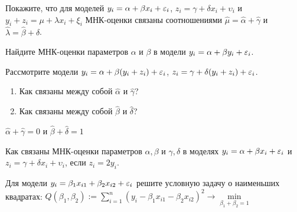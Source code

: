 \documentclass[pdftex,11pt,openany]{book}\usepackage[]{graphicx}\usepackage[]{color}
\begin{document}
\begin{solution}
\end{solution}

\begin{problem}
 Покажите, что для моделей $y_i= \alpha + \beta x_i + \varepsilon_i$, $z_i = \gamma + \delta x_i + \upsilon_i$ и $y_i + z_i = \mu + \lambda x_i + \xi_i$ МНК-оценки связаны соотношениями $\hat{\mu}=\hat{\alpha}+\hat{\gamma}$ и $\hat{\lambda}=\hat{\beta} + \hat{\delta}$.
\end{problem}

\begin{solution}
\end{solution}

\begin{problem}
 Найдите МНК-оценки параметров $\alpha$ и $\beta$ в модели $y_i = \alpha + \beta y_i + \varepsilon_i$.
\end{problem}

\begin{solution}
\end{solution}

\begin{problem}
 Рассмотрите модели $y_i = \alpha + \beta (y_i + z_i) + \varepsilon_i$, $z_i = \gamma + \delta(y_i+z_i) + \varepsilon_i$. 
\begin{enumerate}
\item Как связаны между собой $\hat{\alpha}$ и $\hat{\gamma}$?
\item  Как связаны между собой $\hat{\beta}$ и $\hat{\delta}$?
\end{enumerate} 
\end{problem}

\begin{solution}
$\hat{\alpha} + \hat{\gamma} = 0$ и $\hat{\beta} + \hat{\delta} = 1$
\end{solution}



\begin{problem}
 Как связаны МНК-оценки параметров $\alpha, \beta$ и $\gamma, \delta$ в моделях $y_i = \alpha + \beta x_i + \varepsilon_i$ и $z_i = \gamma + \delta x_i + \upsilon_i$, если $z_i = 2 y_i$.
\end{problem}

\begin{solution}
\end{solution} 

\begin{problem}
 Для модели $y_i = \beta_1 x_{i1} + \beta_2 x_{i2} + \varepsilon_i$ решите условную задачу о наименьших квадратах: $Q(\beta_1, \beta_2) := \sum_{i=1}^n (y_i - \beta_1 x_{i1} - \beta_2 x_{i2})^2 \rightarrow \underset{\beta_1 + \beta_2 = 1}{\min}$
\end{problem}
\end{document}
